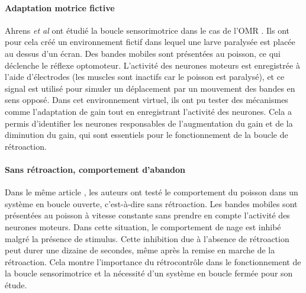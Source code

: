 \paragraph{Adaptation motrice fictive}
Ahrens \emph{et al} ont étudié la boucle sensorimotrice dans le cas de l'OMR \cite{ahrens_brain-wide_2012}. Ils ont pour cela créé un environnement fictif dans lequel une larve paralysée est placée au dessus d'un écran. Des bandes mobiles sont présentées au poisson, ce qui déclenche le réflexe optomoteur. L'activité des neurones moteurs est enregistrée à l'aide d'électrodes (les muscles sont inactifs car le poisson est paralysé), et ce signal est utilisé pour simuler un déplacement par un mouvement des bandes en sens opposé. Dans cet environnement virtuel, ils ont pu tester des mécanismes comme l'adaptation de gain tout en enregistrant l'activité des neurones. Cela a permis d'identifier les neurones responsables de l'augmentation du gain et de la diminution du gain, qui sont essentiels pour le fonctionnement de la boucle de rétroaction.

\paragraph{Sans rétroaction, comportement d'abandon} %
Dans le même article \cite{ahrens_brain-wide_2012}, les auteurs ont testé le comportement du poisson dans un système en boucle ouverte, c'est-à-dire sans rétroaction. Les bandes mobiles sont présentées au poisson à vitesse constante sans prendre en compte l'activité des neurones moteurs. Dans cette situation, le comportement de nage est inhibé malgré la présence de stimulus. Cette inhibition due à l'absence de rétroaction peut durer une dizaine de secondes, même après la remise en marche de la rétroaction. Cela montre l'importance du rétrocontrôle dans le fonctionnement de la boucle sensorimotrice et la nécessité d'un système en boucle fermée pour son étude. 




